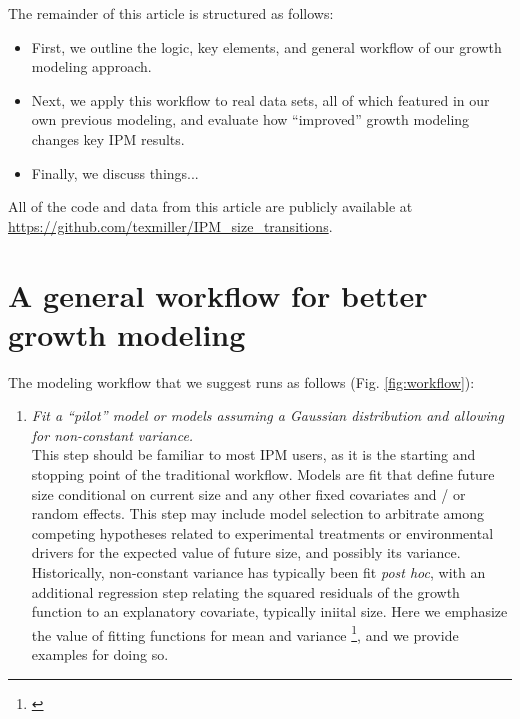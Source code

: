 \documentclass[11pt]{article}
\newcommand{\tom}[2]{{\color{red}{#1}}\footnote{\textit{\color{red}{#2}}}}
\begin{document}
{The remainder of this article is structured as follows:
\begin{itemize}
\item First, we outline the logic, key elements, and general workflow of our growth modeling approach.
\item Next, we apply this workflow to real data sets, all of which featured in our own previous modeling, and evaluate how ``improved'' growth modeling changes key IPM results.
\item Finally, we discuss things...
\end{itemize}
All of the code and data from this article are publicly available at \url{https://github.com/texmiller/IPM_size_transitions}.

\section{A general workflow for better growth modeling}
The modeling workflow that we suggest runs as follows (Fig. \ref{fig:workflow}):
\begin{enumerate}
\item \textit{Fit a ``pilot'' model or models assuming a Gaussian distribution and allowing for non-constant variance.}
\\ 
This step should be familiar to most IPM users, as it is the starting and stopping point of the traditional workflow. 
Models are fit that define future size conditional on current size and any other fixed covariates and / or random effects. 
This step may include model selection to arbitrate among competing hypotheses related to experimental treatments or environmental drivers for the expected value of future size, and possibly its variance.
Historically, non-constant variance has typically been fit \textit{post hoc}, with an additional regression step relating the squared residuals of the growth function to an explanatory covariate, typically iniital size. 
Here we emphasize the value of fitting functions for mean and variance \tom{simultaneously}{In the cactus example, getting the variance right changes the rank of model selection for the mean. Not sure this is worth getting into.}, and we provide examples for doing so. 


\end{enumerate}}
\end{document}

